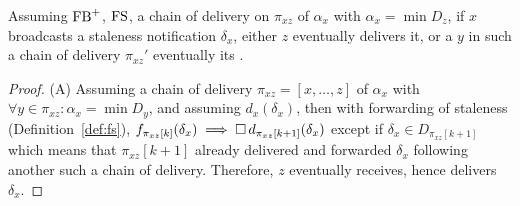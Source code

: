 \begin{lemma} Assuming
  $\textup{FB}^+$, $\textup{FS}$, a chain of delivery on $\pi_{xz}$ of
  $\alpha_x$ with $\alpha_x = \min D_z$, if $x$ broadcasts a staleness
  notification $\delta_x$, either $z$ eventually delivers it, or a
  \process $y$ in such a chain of delivery $\pi_{xz}'$ eventually
   its .
\end{lemma}


\begin{proof}
  (A) Assuming a chain of delivery $\pi_{xz} = [x, \ldots, z]$ of
  $\alpha_x$ with $\forall y \in \pi_{xz}: \alpha_x = \min D_y$, and
  assuming $d_x(\delta_x)$, then with forwarding of staleness
  (Definition~\ref{def:fs}),
  $f_{\pi_{xz}[k]}(\delta_x) \implies \square\,
  d_{\pi_{xz}[k+1]}(\delta_x)$ except if $\delta_x \in D_{\pi_{xz}[k+1]}$ which
  means that $\pi_{xz}[k+1]$ already delivered and forwarded $\delta_x$
  following another such a chain of delivery. Therefore, $z$
  eventually receives, hence delivers $\delta_x$.


\end{proof}
